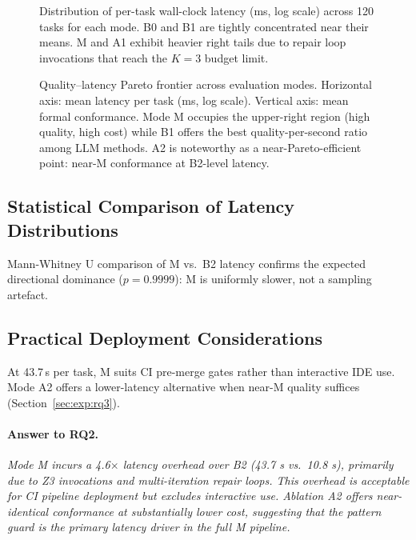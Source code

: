 \begin{figure}[t]
  \centering
  \caption{Distribution of per-task wall-clock latency (ms, log scale) across 120
    tasks for each mode.  B0 and B1 are tightly concentrated near their means.  M and
    A1 exhibit heavier right tails due to repair loop invocations that reach the
    $K=3$ budget limit.}
  \label{fig:latency-distribution}
\end{figure}

\begin{figure}[t]
  \centering
  \caption{Quality--latency Pareto frontier across evaluation modes.  Horizontal axis:
    mean latency per task (ms, log scale).  Vertical axis: mean formal conformance.
    Mode M occupies the upper-right region (high quality, high cost) while B1 offers
    the best quality-per-second ratio among LLM methods.  A2 is noteworthy as a
    near-Pareto-efficient point: near-M conformance at B2-level latency.}
  \label{fig:pareto}
\end{figure}

\subsection{Statistical Comparison of Latency Distributions}

Mann-Whitney U comparison of M vs.\ B2 latency confirms the expected directional
dominance ($p = 0.9999$): M is uniformly slower, not a sampling artefact.

\subsection{Practical Deployment Considerations}

At 43.7\,s per task, M suits CI pre-merge gates rather than interactive IDE use.
Mode A2 offers a lower-latency alternative when near-M quality suffices
(Section~\ref{sec:exp:rq3}).

\paragraph{Answer to RQ2.}
\emph{Mode M incurs a 4.6$\times$ latency overhead over B2 (43.7 s vs.\ 10.8 s),
primarily due to Z3 invocations and multi-iteration repair loops.  This overhead is
acceptable for CI pipeline deployment but excludes interactive use.  Ablation A2
offers near-identical conformance at substantially lower cost, suggesting that the
pattern guard is the primary latency driver in the full M pipeline.}


